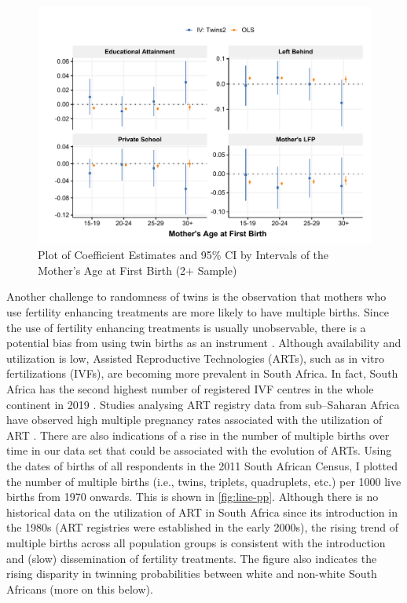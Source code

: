 \begin{figure}[!th]
\centering
\caption{\label{fig:age-mods}Plot of Coefficient Estimates and 95\% CI by Intervals of the Mother's Age at First Birth (2$ + $ Sample)}
\includegraphics[width=\textwidth]{figures/age_mods.pdf}
\end{figure}

Another challenge to randomness of twins is the observation that mothers who use fertility enhancing treatments are more likely to have multiple births. Since the use of fertility enhancing treatments is usually unobservable, there is a potential bias from using twin births as an instrument \parencite{braakmann_reconsidering_2016}. Although availability and utilization is low, Assisted Reproductive Technologies (ARTs), such as in vitro fertilizations (IVFs), are becoming more prevalent in South Africa. In fact, South Africa has the second highest number of registered IVF centres in the whole continent in 2019 \parencite{Ombelet2019}. Studies analysing ART registry data from sub–Saharan Africa have observed high multiple pregnancy rates associated with the utilization of ART \parencite{Botha2018,Dyer2019}. There are also indications of a rise in the number of multiple births over time in our data set that could be associated with the evolution of ARTs. Using the dates of births of all respondents in the 2011 South African Census, I plotted the number of multiple births (i.e., twins, triplets, quadruplets, etc.) per 1000 live births from 1970 onwards. This is shown in \autoref{fig:line-pp}. Although there is no historical data on the utilization of ART in South Africa since its introduction in the 1980s (ART registries were established in the early 2000s), the rising trend of multiple births across all population groups is consistent with the introduction and (slow) dissemination of fertility treatments. The figure also indicates the rising disparity in twinning probabilities between white and non-white South Africans (more on this below).

